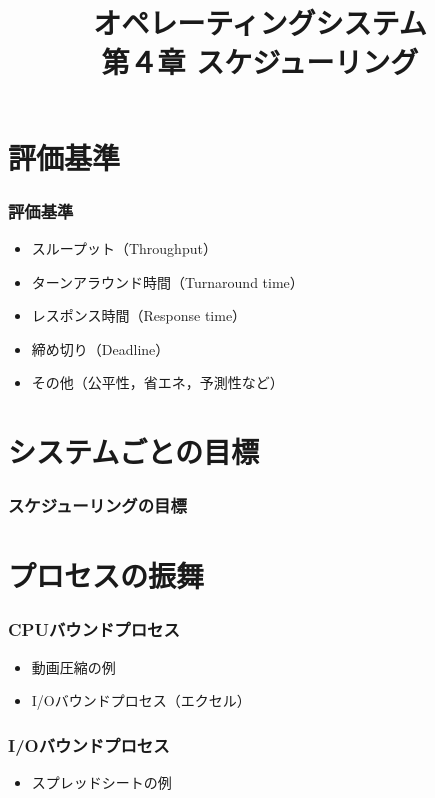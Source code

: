\documentclass{beamer}                   %
\begin{document}
\title[OS]{オペレーティングシステム\\第４章 スケジューリング}
\date{}

\begin{frame}
  \titlepage
\end{frame}


\section{評価基準}
\begin{frame}
  \frametitle{評価基準}
  \begin{itemize}
    \item スループット（Throughput）
    \item ターンアラウンド時間（Turnaround time）
    \item レスポンス時間（Response time）
    \item 締め切り（Deadline）
    \item その他（公平性，省エネ，予測性など）
  \end{itemize}
\end{frame}

\section{システムごとの目標}
\begin{frame}
  \frametitle{スケジューリングの目標}
\end{frame}

\section{プロセスの振舞}
\begin{frame}
  \frametitle{CPUバウンドプロセス}
  \begin{itemize}
    \item 動画圧縮の例
    \item I/Oバウンドプロセス（エクセル）
  \end{itemize}
\end{frame}

\begin{frame}
  \frametitle{I/Oバウンドプロセス}
  \begin{itemize}
    \item スプレッドシートの例
  \end{itemize}
\end{frame}
\end{document}
